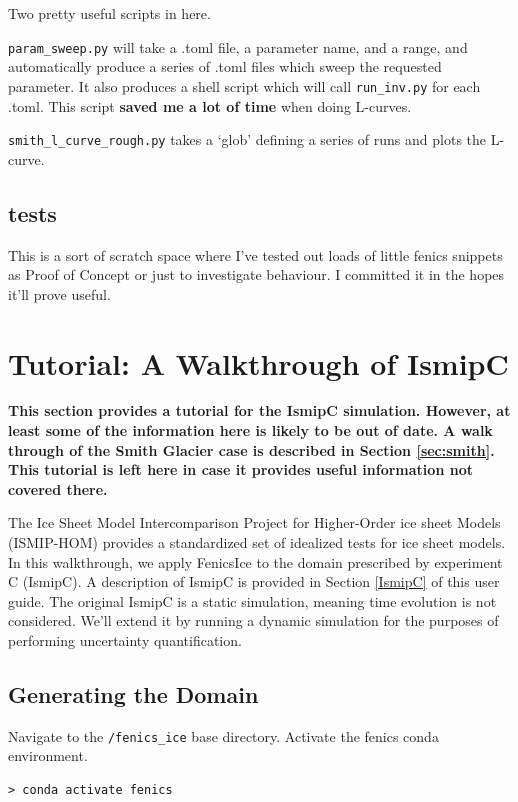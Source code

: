 \documentclass[11pt, reqno, nocenter]{article}
\begin{document}
Two pretty useful scripts in here.

{\tt param\_sweep.py} will take a .toml file, a parameter name, and a range, and automatically produce a series of .toml files which sweep the requested parameter. It also produces a shell script which will call {\tt run\_inv.py} for each .toml. This script \textbf{saved me a lot of time} when doing L-curves.

{\tt smith\_l\_curve\_rough.py} takes a `glob' defining a series of runs and plots the L-curve.

\subsection{tests}

This is a sort of scratch space where I've tested out loads of little fenics snippets as Proof of Concept or just to investigate behaviour. I committed it in the hopes it'll prove useful.

\section{Tutorial: A Walkthrough of IsmipC}

\textbf{This section provides a tutorial for the IsmipC simulation. However, at least some of the information here is likely to be out of date. A walk through of the Smith Glacier case is described in Section \ref{sec:smith}. This tutorial is left here in case it provides useful information not covered there.}

The Ice Sheet Model Intercomparison Project for Higher-Order ice sheet Models (ISMIP-HOM) provides a standardized set of idealized tests for ice sheet models. In this walkthrough, we apply FenicsIce to the domain prescribed by experiment C (IsmipC). A description of IsmipC is provided in Section \ref{IsmipC} of this user guide. The original IsmipC is a static simulation, meaning time evolution is not considered. We'll extend it by running a dynamic simulation for the purposes of performing uncertainty quantification.


\subsection{Generating the Domain}

Navigate to the {\tt /fenics\_ice} base directory. Activate the fenics conda environment.

\begin{verbatim}
> conda activate fenics 
\end{verbatim}
\end{document}
